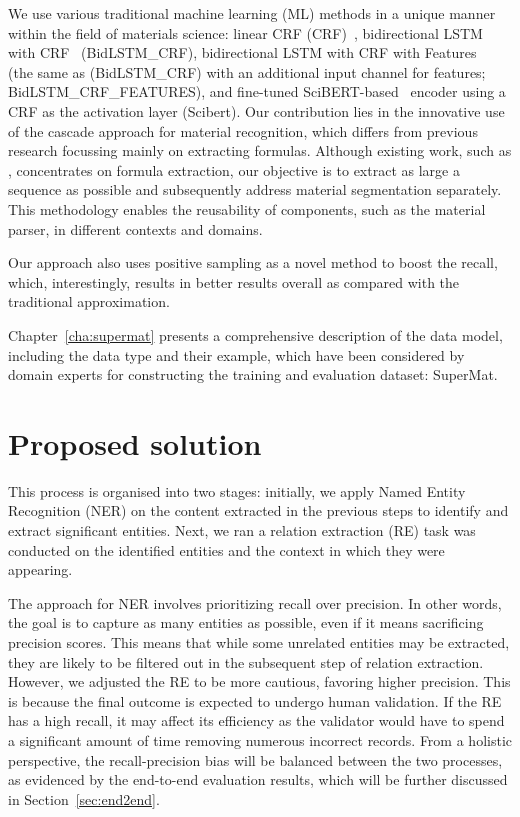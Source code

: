 We use various traditional machine learning (ML) methods in a unique manner within the field of materials science: linear CRF (CRF)~\cite{lafferty2001conditional}, bidirectional LSTM with CRF~\cite{lample2016neural} (BidLSTM\_CRF), bidirectional LSTM with CRF with Features~\cite{lample2016neural} (the same as (BidLSTM\_CRF) with an additional input channel for features; BidLSTM\_CRF\_FEATURES), and fine-tuned SciBERT-based~\cite{Beltagy2019SciBERT} encoder using a CRF as the activation layer (Scibert).
Our contribution lies in the innovative use of the cascade approach for material recognition, which differs from previous research focussing mainly on extracting formulas. Although existing work, such as \cite{kononova2019text, court2020magnetic, dieb2015framework}, concentrates on formula extraction, our objective is to extract as large a sequence as possible and subsequently address material segmentation separately. This methodology enables the reusability of components, such as the material parser, in different contexts and domains.

Our approach also uses positive sampling as a novel method to boost the recall, which, interestingly, results in better results overall as compared with the traditional approximation.

Chapter~\ref{cha:supermat} presents a comprehensive description of the data model, including the data type and their example, which have been considered by domain experts for constructing the training and evaluation dataset: SuperMat. 


\section{Proposed solution}

This process is organised into two stages: initially, we apply Named Entity Recognition (NER) on the content extracted in the previous steps to identify and extract significant entities.
Next, we ran a relation extraction (RE) task was conducted on the identified entities and the context in which they were appearing.

The approach for NER involves prioritizing recall over precision. In other words, the goal is to capture as many entities as possible, even if it means sacrificing precision scores. This means that while some unrelated entities may be extracted, they are likely to be filtered out in the subsequent step of relation extraction.
However, we adjusted the RE to be more cautious, favoring higher precision. This is because the final outcome is expected to undergo human validation. If the RE has a high recall, it may affect its efficiency as the validator would have to spend a significant amount of time removing numerous incorrect records.
From a holistic perspective, the recall-precision bias will be balanced between the two processes, as evidenced by the end-to-end evaluation results, which will be further discussed in Section~\ref{sec:end2end}.

